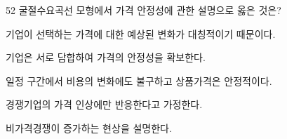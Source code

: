 \begin{question}{52}
굴절수요곡선 모형에서 가격 안정성에 관한 설명으로 옳은 것은?
\begin{choices}
  \item 기업이 선택하는 가격에 대한 예상된 변화가 대칭적이기 때문이다.
  \item 기업은 서로 담합하여 가격의 안정성을 확보한다.
  \item 일정 구간에서 비용의 변화에도 불구하고 상품가격은 안정적이다.
  \item 경쟁기업의 가격 인상에만 반응한다고 가정한다.
  \item 비가격경쟁이 증가하는 현상을 설명한다.
\end{choices}
\end{question}
